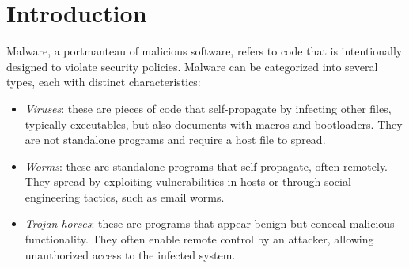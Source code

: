 \section{Introduction}

Malware, a portmanteau of malicious software, refers to code that is intentionally designed to violate security policies. 
Malware can be categorized into several types, each with distinct characteristics:
\begin{itemize}
    \item \textit{Viruses}: these are pieces of code that self-propagate by infecting other files, typically executables, but also documents with macros and bootloaders. 
        They are not standalone programs and require a host file to spread.
    \item \textit{Worms}: these are standalone programs that self-propagate, often remotely. 
        They spread by exploiting vulnerabilities in hosts or through social engineering tactics, such as email worms.
    \item \textit{Trojan horses}: these are programs that appear benign but conceal malicious functionality. 
        They often enable remote control by an attacker, allowing unauthorized access to the infected system.
\end{itemize}

